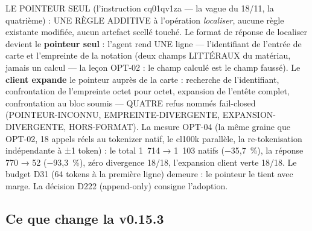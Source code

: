 LE POINTEUR SEUL (l'instruction cq01qv1za — la vague du 18/11, la
quatrième) : UNE RÈGLE ADDITIVE à l'opération \emph{localiser}, aucune
règle existante modifiée, aucun artefact scellé touché. Le format de
réponse de localiser devient le \textbf{pointeur seul} : l'agent rend
UNE ligne — l'identifiant de l'entrée de carte et l'empreinte
 de la notation (deux champs LITTÉRAUX du matériau,
jamais un calcul — la leçon OPT-02 : le champ calculé est le champ
faussé). Le \textbf{client expande} le pointeur auprès de la carte :
recherche de l'identifiant, confrontation de l'empreinte octet pour
octet, expansion de l'entête complet, confrontation au bloc soumis —
QUATRE refus nommés fail-closed (POINTEUR-INCONNU,
EMPREINTE-DIVERGENTE, EXPANSION-DIVERGENTE, HORS-FORMAT). La mesure
OPT-04 (la même graine que OPT-02, 18 appels réels au tokenizer natif,
le cl100k parallèle, la re-tokenisation indépendante à ±1 token) : le
total 1~714 → 1~103 natifs (−35,7~\%), la réponse 770 → 52
(−93,3~\%), zéro divergence 18/18, l'expansion client verte 18/18. Le
budget D31 (64 tokens à la première ligne) demeure : le pointeur le
tient avec marge. La décision D222 (append-only) consigne l'adoption.

\subsection{Ce que change la v0.15.3}\label{sec:nouveautes153}

